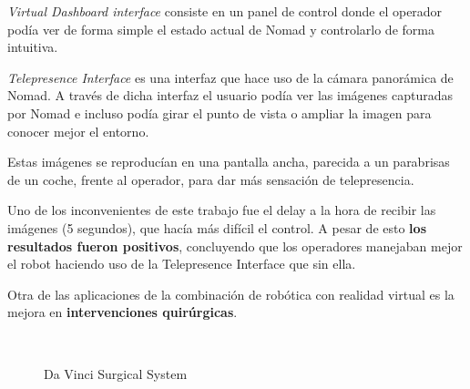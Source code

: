 \documentclass[twoside, 12pt]{epstfg}
\begin{document}
\textit{Virtual Dashboard interface} consiste en un panel de control donde el operador podía ver de forma simple el estado actual de Nomad y controlarlo de forma intuitiva.

\textit{Telepresence Interface} es una interfaz que hace uso de la cámara panorámica de Nomad. A través de dicha interfaz el usuario podía ver las imágenes capturadas por Nomad e incluso podía girar el punto de vista o ampliar la imagen para conocer mejor el entorno.

Estas imágenes se reproducían en una pantalla ancha, parecida a un parabrisas de un coche, frente al operador, para dar más sensación de telepresencia.

Uno de los inconvenientes de este trabajo fue el delay a la hora de recibir las imágenes (5 segundos), que hacía más difícil el control.
A pesar de esto \textbf{los resultados fueron positivos}, concluyendo que los operadores manejaban mejor el robot haciendo uso de la Telepresence Interface que sin ella.


Otra de las aplicaciones de la combinación de robótica con realidad virtual es la mejora en \textbf{intervenciones quirúrgicas}.
\begin{figure}[h]
	\centering
	\\
	\caption{Da Vinci Surgical System} \label{daVinci}
\end{figure}
\end{document}
